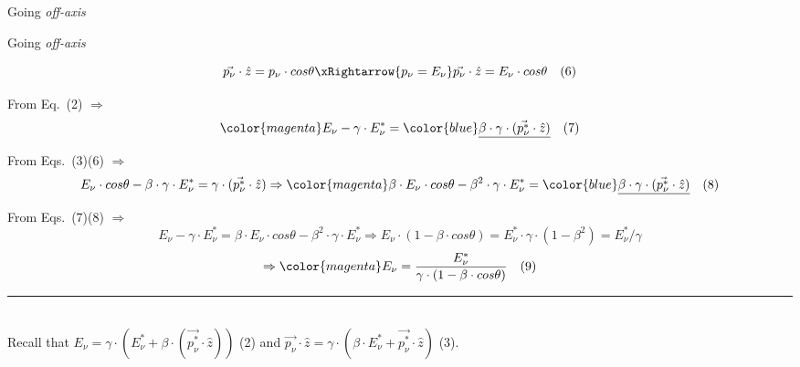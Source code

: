 {\begin{frame}{Going {\em off-axis}}
\end{frame}

%
%

\begin{frame}[t]{Going {\em off-axis}}

{\small
\begin{equation*}
   \vec{p_{\nu}}\cdot \hat{z} = p_{\nu} \cdot cos\theta
   \xRightarrow {p_{\nu} = E_{\nu}}
   \vec{p_{\nu}}\cdot \hat{z} = E_{\nu} \cdot cos\theta \ \ \ (6)
\end{equation*}

\vspace{0.1cm}
From Eq.\ (2) $\Rightarrow$
\begin{equation*}
  {\color{magenta} E_{\nu} - \gamma \cdot E_{\nu}^{*}} =
 {\color{blue} \underline{ \beta \cdot \gamma \cdot (\vec{p_{\nu}^{*}}\cdot \hat{z}) } } \ \ \ (7)
\end{equation*}

\vspace{0.1cm}
From Eqs.\ (3)(6) $\Rightarrow$
\begin{equation*}
  E_{\nu} \cdot cos\theta - \beta \cdot \gamma \cdot E_{\nu}^{*}  =  \gamma \cdot (\vec{p_{\nu}^{*}}\cdot \hat{z}) \Rightarrow
  {\color{magenta} \beta \cdot E_{\nu} \cdot cos\theta - {\beta}^{2} \cdot \gamma \cdot E_{\nu}^{*} } =
  {\color{blue} \underline{\beta \cdot \gamma \cdot (\vec{p_{\nu}^{*}}\cdot \hat{z})} }  \ \ \ (8)
\end{equation*}

\vspace{0.1cm}
From Eqs.\ (7)(8) $\Rightarrow$
\begin{equation*}
  E_{\nu} - \gamma \cdot E_{\nu}^{*} = \beta \cdot E_{\nu} \cdot cos\theta - {\beta}^{2} \cdot \gamma \cdot E_{\nu}^{*} \Rightarrow
  E_{\nu} \cdot (1 - \beta \cdot cos\theta) =  E_{\nu}^{*} \cdot \gamma \cdot (1 - {\beta}^{2}) = E_{\nu}^{*} / \gamma
\end{equation*}
\begin{equation*}
    \Rightarrow {\color{magenta} E_{\nu} = \frac{E_{\nu}^{*}}{\gamma \cdot (1 - \beta \cdot cos\theta)} } \ \ \ (9)
\end{equation*}
}
\noindent\rule{2cm}{0.4pt}\\
{\small
 Recall that
 {\color{magenta} $E_{\nu} = \gamma \cdot (E_{\nu}^{*} + \beta \cdot (\vec{p_{\nu}^{*}}\cdot \hat{z}))$} (2) and
 {\color{magenta} $\vec{p_{\nu}}\cdot \hat{z} = \gamma \cdot (\beta \cdot E_{\nu}^{*} + \vec{p_{\nu}^{*}}\cdot \hat{z})$} (3).
}


\end{frame}}
